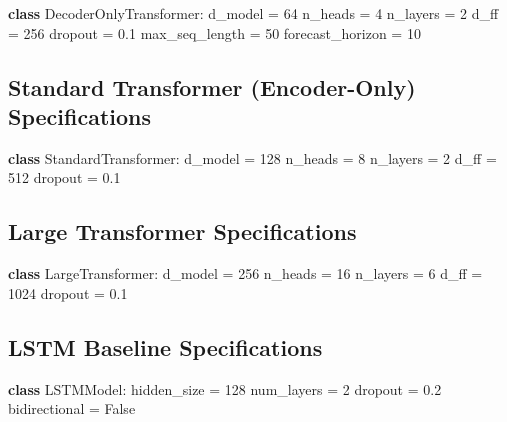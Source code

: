 \documentclass[11pt]{article}
\begin{document}
\begin{algorithmic}
\STATE \textbf{class} DecoderOnlyTransformer:
\STATE \quad d\_model = 64 
\STATE \quad n\_heads = 4 
\STATE \quad n\_layers = 2 
\STATE \quad d\_ff = 256 
\STATE \quad dropout = 0.1 
\STATE \quad max\_seq\_length = 50 
\STATE \quad forecast\_horizon = 10 
\STATE {}
\end{algorithmic}

\subsection{Standard Transformer (Encoder-Only) Specifications}

\begin{algorithmic}
\STATE \textbf{class} StandardTransformer:
\STATE \quad d\_model = 128 
\STATE \quad n\_heads = 8 
\STATE \quad n\_layers = 2 
\STATE \quad d\_ff = 512 
\STATE \quad dropout = 0.1 
\STATE {}
\end{algorithmic}

\subsection{Large Transformer Specifications}

\begin{algorithmic}
\STATE \textbf{class} LargeTransformer:
\STATE \quad d\_model = 256 
\STATE \quad n\_heads = 16 
\STATE \quad n\_layers = 6 
\STATE \quad d\_ff = 1024 
\STATE \quad dropout = 0.1 
\STATE {}
\end{algorithmic}

\subsection{LSTM Baseline Specifications}

\begin{algorithmic}
\STATE \textbf{class} LSTMModel:
\STATE \quad hidden\_size = 128 
\STATE \quad num\_layers = 2 
\STATE \quad dropout = 0.2 
\STATE \quad bidirectional = False 
\STATE {}
\end{algorithmic}
\end{document}
